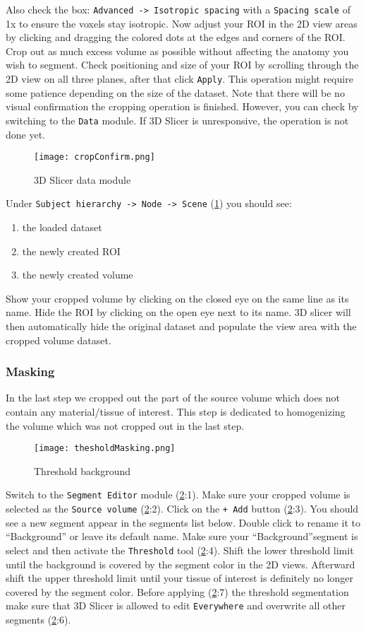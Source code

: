 Also check the box: \texttt{Advanced -> Isotropic spacing} with a \texttt{Spacing scale} of 1x to ensure the voxels stay isotropic.
Now adjust your ROI in the 2D view areas by clicking and dragging the colored dots at the edges and corners of the ROI.
Crop out as much excess volume as possible without affecting the anatomy you wish to segment.
Check positioning and size of your ROI by scrolling through the 2D view on all three planes, after that click \texttt{Apply}.
This operation might require some patience depending on the size of the dataset.
Note that there will be no visual confirmation the cropping operation is finished.
However, you can check by switching to the \texttt{Data} module.
If 3D Slicer is unresponsive, the operation is not done yet.
\newline
\begin{figure}[h!]
	\centerline{
		\texttt{[image: cropConfirm.png]}}
	\caption{3D Slicer data module}\label{fig:cC}
\end{figure}
\newline
\noindent
Under \texttt{Subject hierarchy -> Node -> Scene} (\cref{fig:cC}) you should see:
\begin{enumerate}
	\item the loaded dataset
	\item the newly created ROI
	\item the newly created volume
\end{enumerate}
Show your cropped volume by clicking on the closed eye on the same line as its name. Hide the ROI by clicking on the open eye next to its name.
3D slicer will then automatically hide the original dataset and populate the view area with the cropped volume dataset.

\subsubsection{Masking}\label{mask}
In the last step we cropped out the part of the source volume which does not contain any material/tissue of interest.
This step is dedicated to homogenizing the volume which was not cropped out in the last step.
\begin{figure}[h!]
	\centerline{
		\texttt{[image: thesholdMasking.png]}}
	\caption{Threshold background}\label{fig:tM}
\end{figure}
Switch to the \texttt{Segment Editor} module (\cref{fig:tM}:1).
Make sure your cropped volume is selected as the \texttt{Source volume} (\cref{fig:tM}:2).
Click on the \texttt{+ Add} button (\cref{fig:tM}:3). You should see a new segment appear in the segments list below.
Double click to rename it to ``Background'' or leave its default name.
Make sure your ``Background''segment is select and then activate the \texttt{Threshold} tool (\cref{fig:tM}:4).
Shift the lower threshold limit until the background is covered by the segment color in the 2D views. Afterward shift the upper threshold limit until your tissue of interest is definitely no longer covered by the segment color.
Before applying (\cref{fig:tM}:7) the threshold segmentation make sure that 3D Slicer is allowed to edit \texttt{Everywhere} and overwrite all other segments (\cref{fig:tM}:6).

